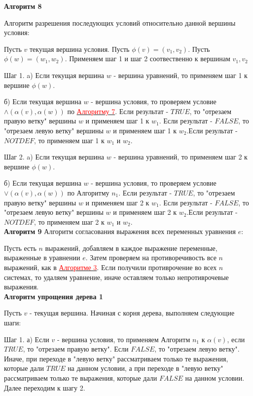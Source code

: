 \documentclass[12pt]{article}
\begin{document}
      \hypertarget{a8}{{\bf Алгоритм 8}} Алгоритм разрешения последующих условий относительно данной вершины условия:
      
       Пусть $v$ текущая вершина условия. Пусть $\phi(v)=(v_{1},v_{2})$. Пусть $\phi(w)=(w_{1},w_{2})$. Применяем шаг 1 и шаг 2 соотвественно к вершинам $v_{1},v_{2}$
       
       Шаг 1. a) Если текущая вершина $w$ - вершина уравнений, то применяем шаг 1 к вершине $\phi(w)$. 
       
       б) Если текущая вершина $w$ - вершина условия, то проверяем условие $\wedge(\alpha(v),\alpha(w))$ по  \hyperlink{a7}{ \textcolor{red}{Алгоритму 7}}. Если результат - $TRUE$, то "отрезаем правую ветку" вершины $w$ и применяем шаг 1 к $w_{1}$. Если результат - $FALSE$, то "отрезаем левую ветку" вершины $w$ и применяем шаг 1 к $w_{2}$.Если результат - $NOTDEF$, то применяем шаг 1 к $w_{1}$ и $w_{2}$. 
       
       Шаг 2. a) Если текущая вершина $w$ - вершина уравнений, то применяем шаг 2 к вершине $\phi(w)$.
       
        б) Если текущая вершина $w$ - вершина условия, то проверяем условие $\vee(\alpha(v),\alpha(w))$ по Алгоритму $n_{1}$. Если результат - $TRUE$, то "отрезаем правую ветку" вершины $w$ и применяем шаг 2 к $w_{1}$. Если результат - $FALSE$, то "отрезаем левую ветку" вершины $w$ и применяем шаг 2 к $w_{2}$.Если результат - $NOTDEF$, то применяем шаг 2 к $w_{1}$ и $w_{2}$.
      \\
      
      \hypertarget{a9}{{\bf Алгоритм 9}} Алгоритм согласования выражения всех переменных уравнения $e$:
      
      Пусть есть $n$ выражений, добавляем в каждое выражение переменные, выраженные в уравнении $e$. Затем проверяем на противоречивость все $n$ выражений, как в  \hyperlink{a3}{ \textcolor{red}{Алгоритме 3}}. Если получили противрочение во всех $n$ системах, то удаляем уравнение, иначе оставляем только непротиврочевые выражения.
      \\
      
     {\bf Алгоритм упрощения дерева 1} 
     
     Пусть $v$ - текущая вершина.
     Начиная с корня дерева, выполняем следующие шаги:
     
     Шаг 1. а) Если $v$ - вершина условия, то применяем Алгоритм $n_{1}$ к  $\alpha(v)$, если $TRUE$, то "отрезаем правую ветку".  Если $FALSE$, то "отрезаем левую ветку". Иначе, при переходе в "левую ветку" рассматриваем только те выражения, которые дали $TRUE$ на данном условии, а при переходе в "левую ветку" рассматриваем только те выражения, которые дали $FALSE$ на данном условии. Далее переходим к шагу 2.
     
\end{document}
